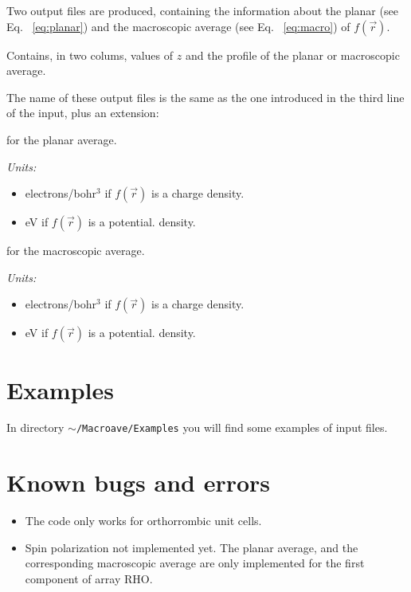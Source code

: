  Two output files are produced, containing the information
 about the planar (see Eq. ~\ref{eq:planar}) and the 
 macroscopic average (see Eq. ~\ref{eq:macro}) of
 $f \left( \vec{r} \right)$.
 
 Contains, in two colums, values of $z$ and the profile
 of the planar or macroscopic average. 

 The name of these output files is the same as the one
 introduced in the third line of the input, plus an extension:

 \begin{description}
 \itemsep 10pt
 \parsep 0pt

 \item[.PAV] for the planar average.

      {\it Units:}
      \begin{itemize}
         \item electrons/bohr$^3$ if $f \left( \vec{r} \right)$ is a charge
               density.
         \item eV if $f \left( \vec{r} \right)$ is a potential. 
               density.
      \end{itemize}
 
 \item[.MAV] for the macroscopic average.

      {\it Units:}
      \begin{itemize}
         \item electrons/bohr$^3$ if $f \left( \vec{r} \right)$ is a charge
               density.
         \item eV if $f \left( \vec{r} \right)$ is a potential. 
               density.
      \end{itemize}
 
 \end{description}


 \section{Examples}

 In directory {\tt $\sim$/Macroave/Examples} you will find some
 examples of input files.

 \section{Known bugs and errors}

 \begin{itemize}
    \item The code only works for orthorrombic unit cells. 
    \item Spin polarization not implemented yet. 
          The planar average, and the corresponding macroscopic average
          are only implemented for the first component of array RHO.
 \end{itemize}


